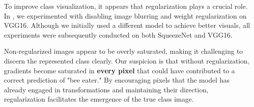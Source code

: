 To improve class visualization, it appears that regularization plays a crucial role. In , we experimented with disabling image blurring and weight regularization on VGG16. Although we initially used a different model to achieve better visuals, all experiments were subsequently conducted on both SqueezeNet and VGG16.


Non-regularized images appear to be overly saturated, making it challenging to discern the represented class clearly. Our suspicion is that without regularization, gradients become saturated in \textbf{every pixel} that could have contributed to a correct prediction of "bee eater." By encouraging pixels that the model has already engaged in transformations and maintaining their direction, regularization facilitates the emergence of the true class image.

